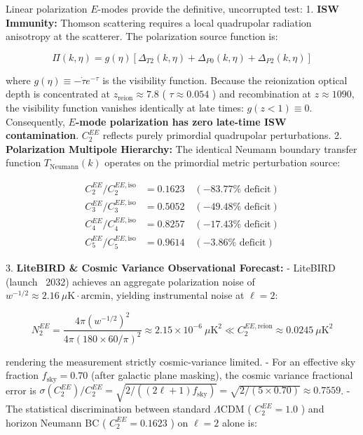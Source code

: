 \documentclass[11pt,a4paper]{article}
\theoremstyle{definition}
\theoremstyle{remark}
\begin{document}
Linear polarization $E$-modes provide the definitive, uncorrupted test:
1. \textbf{ISW Immunity:} Thomson scattering requires a local quadrupolar radiation anisotropy at the scatterer. The polarization source function is:


\begin{equation}
\Pi(k, \eta) = g(\eta) \left[ \Delta_{T2}(k, \eta) + \Delta_{P0}(k, \eta) + \Delta_{P2}(k, \eta) \right]
\end{equation}


where $g(\eta) \equiv -\dot{\tau} e^{-\tau}$ is the visibility function. Because the reionization optical depth is concentrated at $z_{\text{reion}} \approx 7.8$ ( $\tau \approx 0.054$ ) and recombination at $z \approx 1090$, the visibility function vanishes identically at late times: $g(z < 1) \equiv 0$. Consequently, \textbf{$E$-mode polarization has zero late-time ISW contamination}. $C_2^{EE}$ reflects purely primordial quadrupolar perturbations.
2. \textbf{Polarization Multipole Hierarchy:} The identical Neumann boundary transfer function $T_{\text{Neumann}}(k)$ operates on the primordial metric perturbation source:


\begin{equation}
\begin{aligned}
C_2^{EE} / C_2^{EE, \text{iso}} &= 0.1623 \quad (-83.77\% \text{ deficit}) \\
C_3^{EE} / C_3^{EE, \text{iso}} &= 0.5052 \quad (-49.48\% \text{ deficit}) \\
C_4^{EE} / C_4^{EE, \text{iso}} &= 0.8257 \quad (-17.43\% \text{ deficit}) \\
C_5^{EE} / C_5^{EE, \text{iso}} &= 0.9614 \quad (-3.86\% \text{ deficit})
\end{aligned}
\end{equation}


3. \textbf{LiteBIRD \& Cosmic Variance Observational Forecast:}
- LiteBIRD (launch ~2032) achieves an aggregate polarization noise of $w^{-1/2} \approx 2.16\ \mu\text{K}\cdot\text{arcmin}$, yielding instrumental noise at $\ell=2$:


\begin{equation}
N_2^{EE} = \frac{4\pi (w^{-1/2})^2}{4\pi (180 \times 60 / \pi)^2} \approx 2.15 \times 10^{-6}\ \mu\text{K}^2 \ll C_2^{EE, \text{reion}} \approx 0.0245\ \mu\text{K}^2
\end{equation}


rendering the measurement strictly cosmic-variance limited.
- For an effective sky fraction $f_{\text{sky}} = 0.70$ (after galactic plane masking), the cosmic variance fractional error is $\sigma(C_2^{EE}) / C_2^{EE} = \sqrt{2 / ((2\ell+1) f_{\text{sky}})} = \sqrt{2 / (5 \times 0.70)} \approx 0.7559$.
- The statistical discrimination between standard $\Lambda$CDM ( $C_2^{EE} = 1.0$ ) and horizon Neumann BC ( $C_2^{EE} = 0.1623$ ) on $\ell=2$ alone is:
\end{document}
